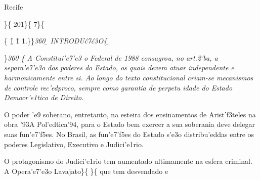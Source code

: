  \ltrch{} 
Recife \par \}\{\rtlch{}  \ltrch{}
201\}\{\rtlch{}  \ltrch{}
 7\}\{\rtlch{}
 \ltrch{}
\par \{\listtext\pard\plain\ltrpar \rtlch{} \ab{} \ltrch{}
\b\f1
\hich{}\dbch{}\loch\f1
1.\tab\}\}\pard \ltrpar\qj {}\sl360
\widctlpar\wrapdefault\aspalpha\aspnum\faauto{}\adjustright{} {\rtlch{} \ab{} \ltrch{} \b{} INTRODU\'c7\'c3O}\{\rtlch{}
\ab{} \ltrch{} \b{}
\par \}\pard \ltrpar\qj {}\sl360\widctlpar\wrapdefault\aspalpha\aspnum\faauto\adjustright{} \{\rtlch{}
 \ltrch{}  A Constitui'e7'e3 o
Federal de 1988 consagrou, no art.2'ba, a separa'e7'e3o dos poderes do
Estado, os quais devem atuar independente e harmonicamente entre si. Ao
longo do texto constitucional criam-se mecanismos de controle
rec'edproco, sempre como garantia de perpetu idade do Estado
Democr'e1tico de Direito. \par O poder 'e9 soberano, entretanto, na
esteira dos ensinamentos de Arist'f3teles na obra '93A Pol'edtica'94,
para o Estado bem exercer a sua soberania deve delegar suas fun'e7'f5es.
No Brasil, as fun'e7'f5es do Estado s'e3o distribu'eddas entre os
poderes Legislativo, Executivo e Judici'e1rio.\\
\par O protagonismo do Judici'e1rio tem aumentado ultimamente na esfera
criminal. A Opera'e7'e3o Lavajato\}\{\rtlch{}  \ltrch{}
\super{} \}\{\rtlch{}
 \ltrch{}  que tem desvendado e
